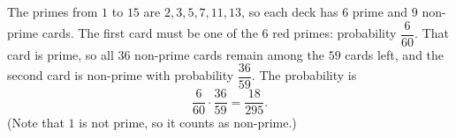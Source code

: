 The primes from $1$ to $15$ are $2,3,5,7,11,13$, so each deck has $6$ prime and $9$ non-prime cards. The first card must be one of the $6$ red primes: probability $\dfrac{6}{60}$. That card is prime, so all $36$ non-prime cards remain among the $59$ cards left, and the second card is non-prime with probability $\dfrac{36}{59}$. The probability is
\[
\dfrac{6}{60}\cdot\dfrac{36}{59}=\boxed{\dfrac{18}{295}}.
\]
(Note that $1$ is not prime, so it counts as non-prime.)
